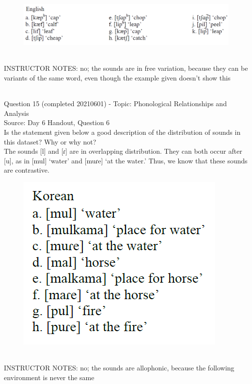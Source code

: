 \documentclass[12pt]{article}
\begin{document}
\begin{figure}[H]
\includegraphics{../images/english_labials.png}
\end{figure}

~\\
INSTRUCTOR NOTES: no; the sounds are in free variation, because they can be variants of the same word, even though the example given doesn't show this


~\\

{\large Question 15} (completed 20210601) - Topic: Phonological Relationships and Analysis\\
Source: Day 6 Handout, Question 6\\

Is the statement given below a good description of the distribution of sounds in this dataset? Why or why not?\\

The sounds {[l]} and {[ɾ]} are in overlapping distribution. They can both occur after {[u]}, as in {[mul]} ‘water’ and {[muɾe]} ‘at the water.’ Thus, we know that these sounds are contrastive.

\begin{figure}[H]
\includegraphics{../images/korean.png}
\end{figure}

~\\
INSTRUCTOR NOTES: no; the sounds are allophonic, because the following environment is never the same
\end{document}

